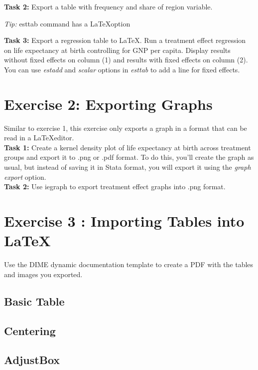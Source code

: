 \documentclass[12pts]{report}
\begin{document}
\textbf{Task 2:}  Export a table with frequency and share of region variable. 
\begin{center}
	\colorbox{BurntOrange}{\emph{Tip:} esttab command has a \LaTeX\space option}
\end{center}

\textbf{Task 3:} Export a regression table to \LaTeX. Run a treatment effect regression on life expectancy at birth controlling for GNP per capita. Display results without fixed effects on column (1) and results with fixed effects on column (2). You can use \textit{estadd} and \textit{scalar} options in \textit{esttab} to add a line for fixed effects.

\section*{Exercise 2: Exporting Graphs}
Similar to exercise 1, this exercise only exports a graph in a format that can be read in a \LaTeX\space editor. \\

\textbf{Task 1:}  Create a kernel density plot of life expectancy at birth across treatment groups and export it to .png or .pdf format. To do this, you'll create the graph as usual, but instead of saving it in Stata format, you will export it using the \textit{graph export} option. \\

\textbf{Task 2:}  Use iegraph to export treatment effect graphs into .png format.

\section*{Exercise 3 : Importing Tables into \LaTeX}
Use the DIME dynamic documentation template to create a PDF with the tables and images you exported.

\subsection*{Basic Table}

\subsection*{Centering}

\subsection*{AdjustBox}
\end{document}
